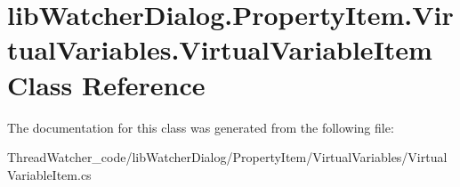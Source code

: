 \hypertarget{classlib_watcher_dialog_1_1_property_item_1_1_virtual_variables_1_1_virtual_variable_item}{\section{lib\+Watcher\+Dialog.\+Property\+Item.\+Virtual\+Variables.\+Virtual\+Variable\+Item Class Reference}
\label{classlib_watcher_dialog_1_1_property_item_1_1_virtual_variables_1_1_virtual_variable_item}
}


The documentation for this class was generated from the following file\+:\begin{DoxyCompactItemize}
\item 
Thread\+Watcher\+\_\+code/lib\+Watcher\+Dialog/\+Property\+Item/\+Virtual\+Variables/Virtual\+Variable\+Item.\+cs\end{DoxyCompactItemize}
